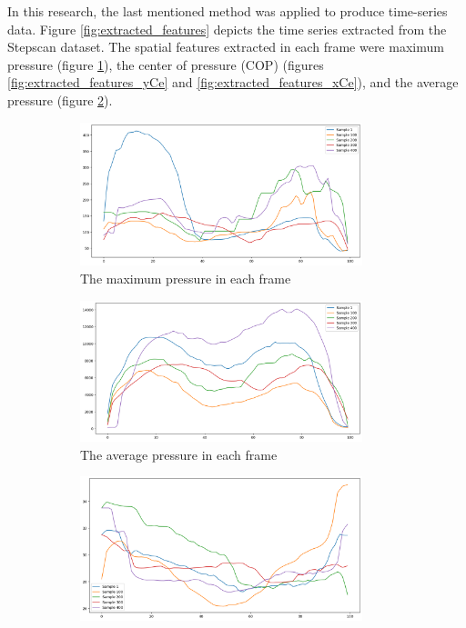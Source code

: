 In this research, the last mentioned method was applied to produce time-series data. Figure \ref{fig:extracted_features} depicts the time series extracted from the Stepscan dataset. The spatial features extracted in each frame were maximum pressure (figure \ref{fig:extracted_features_max}), the center of pressure (COP) (figures \ref{fig:extracted_features_yCe} and \ref{fig:extracted_features_xCe}), and the average pressure (figure \ref{fig:extracted_features_sum}). 
\begin{figure}
     \centering
     \begin{subfigure}[b]{0.5\textwidth}
         \centering
         \includegraphics[width=0.9\textwidth]{figures/project/df_max.png}
         \caption{The maximum pressure in each frame}
         \label{fig:extracted_features_max}
     \end{subfigure}
     \hfill
     \begin{subfigure}[b]{0.5\textwidth}
         \centering
         \includegraphics[width=0.9\textwidth]{figures/project/df_sum.png}
         \caption{The average pressure in each frame}
         \label{fig:extracted_features_sum}
     \end{subfigure}
     \vfill
     \begin{subfigure}[b]{0.5\textwidth}
         \centering
         \includegraphics[width=0.9\textwidth]{figures/project/df_xCe.png}

\end{subfigure}
\end{figure}
